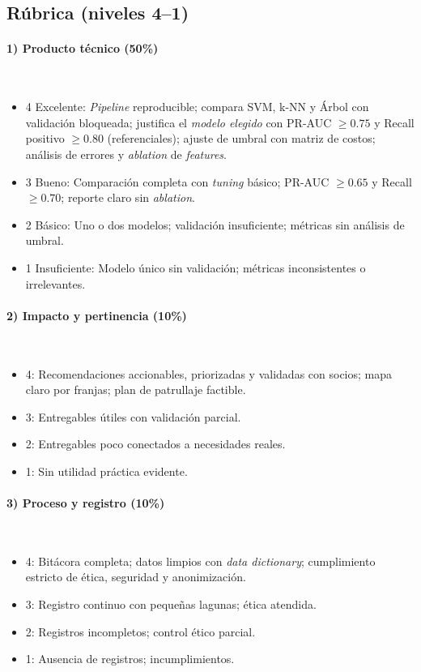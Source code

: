\documentclass[a4,11pt]{aleph-notas}
\begin{document}
\subsection*{Rúbrica (niveles 4--1)}
\paragraph{1) Producto técnico (50\%)}~
\begin{itemize}
    \item {4 Excelente:} \emph{Pipeline} reproducible; compara SVM, k-NN y Árbol con validación bloqueada; justifica el \emph{modelo elegido} con {PR-AUC} \(\geq 0.75\) y {Recall positivo} \(\geq 0.80\) (referenciales); ajuste de umbral con matriz de costos; análisis de errores y \emph{ablation} de \emph{features}.
    \item {3 Bueno:} Comparación completa con \emph{tuning} básico; PR-AUC \(\geq 0.65\) y Recall \(\geq 0.70\); reporte claro sin \emph{ablation}.
    \item {2 Básico:} Uno o dos modelos; validación insuficiente; métricas sin análisis de umbral.
    \item {1 Insuficiente:} Modelo único sin validación; métricas inconsistentes o irrelevantes.
\end{itemize}

\paragraph{2) Impacto y pertinencia (10\%)}~
\begin{itemize}
    \item {4:} Recomendaciones accionables, priorizadas y validadas con socios; mapa claro por franjas; plan de patrullaje factible.
    \item {3:} Entregables útiles con validación parcial.
    \item {2:} Entregables poco conectados a necesidades reales.
    \item {1:} Sin utilidad práctica evidente.
\end{itemize}

\paragraph{3) Proceso y registro (10\%)}~
\begin{itemize}
    \item {4:} Bitácora completa; datos limpios con \emph{data dictionary}; cumplimiento estricto de ética, seguridad y anonimización.
    \item {3:} Registro continuo con pequeñas lagunas; ética atendida.
    \item {2:} Registros incompletos; control ético parcial.
    \item {1:} Ausencia de registros; incumplimientos.
\end{itemize}
\end{document}
